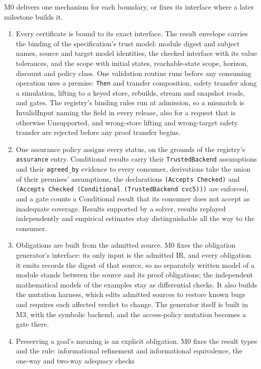 \documentclass[11pt]{article}
\newcommand{\code}[1]{\texttt{#1}}
\begin{document}
M0 delivers one mechanism for each boundary, or fixes its interface where a later milestone builds
it.
\begin{enumerate}
\item Every certificate is bound to its exact interface. The result envelope carries the binding of
the specification's trust model: module digest and subject names, source and target model
identities, the checked interface with its value tolerances, and the scope with initial states,
reachable-state scope, horizon, discount and policy class. One validation routine runs before any
consuming operation uses a premise: \code{Then} and transfer composition, safety transfer along a
simulation, lifting to a keyed store, rebuilds, stream and snapshot reads, and gates. The registry's
binding rules run at admission, so a mismatch is InvalidInput naming the field in every release,
also for a request that is otherwise Unsupported, and wrong-store lifting and wrong-target safety
transfer are rejected before any proof transfer begins.
\item One assurance policy assigns every status, on the grounds of the registry's \code{assurance}
entry. Conditional results carry their \code{TrustedBackend} assumptions and their
\code{agreed\_by} evidence to every consumer, derivations take the union of their premises'
assumptions, the declarations \code{(Accepts Checked)} and
\code{(Accepts Checked (Conditional (TrustedBackend cvc5)))} are enforced, and a gate counts a
Conditional result that its consumer does not accept as inadequate coverage. Results supported by a
solver, results replayed independently and empirical estimates stay distinguishable all the way to
the consumer.
\item Obligations are built from the admitted source. M0 fixes the obligation generator's interface:
its only input is the admitted IR, and every obligation it emits records the digest of that source,
so no separately written model of a module stands between the source and its proof obligations;
the independent mathematical models of the examples stay as differential checks. It also builds the
mutation harness, which edits admitted sources to restore known bugs and requires each affected
verdict to change. The generator itself is built in M3, with the symbolic backend, and the
access-policy mutation becomes a gate there.
\item Preserving a goal's meaning is an explicit obligation. M0 fixes the result types and the rule:
informational refinement and informational equivalence, the one-way and two-way adequacy checks

\end{enumerate}
\end{document}
